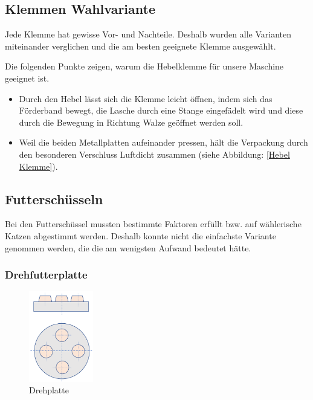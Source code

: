 \subsection{Klemmen Wahlvariante}

Jede Klemme hat gewisse Vor- und Nachteile. Deshalb wurden alle Varianten miteinander verglichen und die am besten geeignete Klemme ausgewählt.

Die folgenden Punkte zeigen, warum die Hebelklemme für unsere Maschine geeignet ist.

\begin{itemize}
\item Durch den Hebel lässt sich die Klemme leicht öffnen, indem sich das Förderband bewegt, die Lasche durch eine Stange eingefädelt wird und diese durch die Bewegung in Richtung Walze geöffnet werden soll.
\item Weil die beiden Metallplatten aufeinander pressen, hält die Verpackung durch den besonderen Verschluss Luftdicht zusammen (siehe Abbildung: \ref{Hebel Klemme}). 

\end{itemize} 

\newpage
\subsection{Futterschüsseln}

Bei den Futterschüssel mussten bestimmte Faktoren erfüllt bzw. auf wählerische Katzen abgestimmt werden. Deshalb konnte nicht die einfachste Variante genommen werden, die die am wenigsten Aufwand bedeutet hätte. 

\subsubsection{Drehfutterplatte}

\begin{figure}
\vspace{-40pt}
  \begin{center}
    \includegraphics[width=0.25\textwidth]{Bilder/Powerpoint/Drehplatte}
  \end{center}
  \caption{Drehplatte}
  \label{Drehplatte}
  \vspace{-20pt}
\end{figure}

